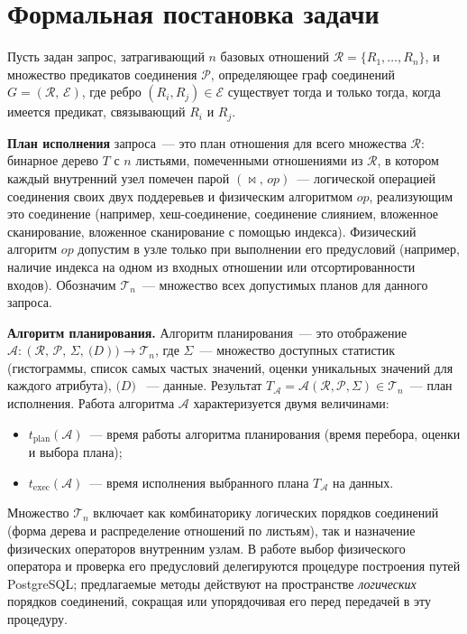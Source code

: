 \section{Формальная постановка задачи}



Пусть задан запрос, затрагивающий $n$ базовых отношений $\mathcal{R} = \{R_1, \ldots, R_n\}$, и
множество предикатов соединения $\mathcal{P}$, определяющее граф соединений
$G = (\mathcal{R},\, \mathcal{E})$, где ребро $(R_i, R_j) \in \mathcal{E}$ существует тогда и только тогда,
когда имеется предикат, связывающий $R_i$ и $R_j$.

\textbf{План исполнения} запроса~--- это план отношения для всего множества
$\mathcal{R}$: бинарное дерево $T$ с $n$ листьями, помеченными
отношениями из $\mathcal{R}$, в котором каждый внутренний узел помечен
парой $(\Join,\, op)$~--- логической операцией соединения своих двух
поддеревьев и физическим алгоритмом $op$, реализующим это соединение
(например, хеш-соединение, соединение слиянием, вложенное сканирование, вложенное сканирование с помощью индекса).
Физический алгоритм $op$ допустим в узле только при выполнении его
предусловий (например, наличие индекса на
одном из входных отношении или отсортированности входов).
Обозначим $\mathcal{T}_n$~--- множество всех допустимых планов
для данного запроса.
\par

\textbf{Алгоритм планирования.}
Алгоритм планирования~--- это отображение
$\mathcal{A}\colon (\mathcal{R},\, \mathcal{P},\, \Sigma,\ \mathcal(D)) \to \mathcal{T}_n$,
где $\Sigma$~--- множество доступных статистик (гистограммы, список самых частых значений,
оценки уникальных значений для каждого атрибута), $\mathcal(D)$ ~--- данные.
Результат $T_{\mathcal{A}} = \mathcal{A}(\mathcal{R}, \mathcal{P}, \Sigma) \in \mathcal{T}_n$~---
план исполнения.
Работа алгоритма $\mathcal{A}$ характеризуется двумя величинами:
\begin{itemize}
    \item $t_{\mathrm{plan}}(\mathcal{A})$~--- время работы алгоритма планирования (время перебора, оценки и выбора плана);
    \item $t_{\mathrm{exec}}(\mathcal{A})$~--- время исполнения выбранного плана $T_{\mathcal{A}}$ на данных.
\end{itemize}

Множество $\mathcal{T}_n$ включает как комбинаторику логических порядков
соединений (форма дерева и распределение отношений по листьям), так и
назначение физических операторов внутренним узлам. В  работе выбор физического оператора и проверка его предусловий делегируются 
процедуре построения путей PostgreSQL; предлагаемые методы действуют на пространстве \emph{логических} порядков соединений,
сокращая или упорядочивая его перед передачей в эту процедуру.
\par

